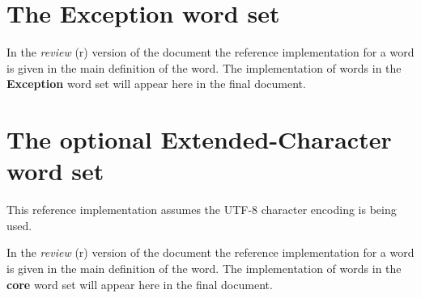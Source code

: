 
\pagebreak
\section{The Exception word set} %
\ifinline
	\begin{editor}
		In the \emph{review} (r) version of the document the
		reference implementation for a word is given in the main
		definition of the word.  The implementation of words in
		the \textbf{Exception} word set will appear here in the final
		document.
	\end{editor}
\else
	
\fi


\pagebreak
\section{The optional Extended-Character word set} %
\label{imp:xchar}

This reference implementation assumes the UTF-8 character encoding
is being used.

\ifinline
	\begin{editor}
		In the \emph{review} (r) version of the document the
		reference implementation for a word is given in the main
		definition of the word.  The implementation of words
		in the \textbf{core} word set will appear here in the
		final document.
	\end{editor}
\else
	
\fi
